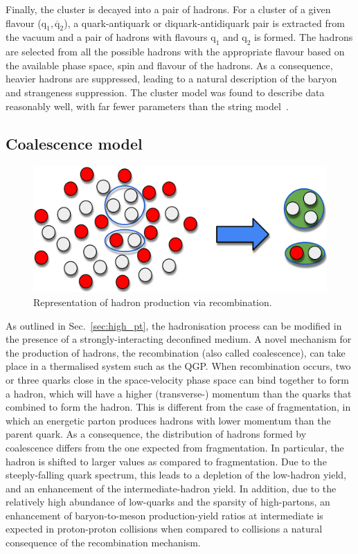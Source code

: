 Finally, the cluster is decayed into a pair of hadrons. For a cluster of a given flavour ($\mathrm{q_1, \overline{q}_2}$), a quark-antiquark or diquark-antidiquark pair is extracted from the vacuum and a pair of hadrons with flavours $\mathrm{q_1}$ and $\mathrm{q_2}$ is formed. The hadrons are selected from all the possible hadrons with the appropriate flavour based on the available phase space, spin and flavour of the hadrons. As a consequence, heavier hadrons are suppressed, leading to a natural description of the baryon and strangeness suppression. The cluster model was found to describe data reasonably well, with far fewer parameters than the string model~\cite{Seymour:2013ega}.

\subsection{Coalescence model}
\begin{figure}[htb]
    \centering
    \includegraphics[width=0.7\linewidth]{Figures/Chapter 2/Coalescence.png}
    \caption{Representation of hadron production via recombination.}
\end{figure}

As outlined in Sec.~\ref{sec:high_pt}, the hadronisation process can be modified in the presence of a strongly-interacting deconfined medium. A novel mechanism for the production of hadrons, the recombination (also called coalescence), can take place in a thermalised system such as the QGP. When recombination occurs, two or three quarks close in the space-velocity phase space can bind together to form a hadron, which will have a higher (transverse-) momentum than the quarks that combined to form the hadron. This is different from the case of fragmentation, in which an energetic parton produces hadrons with lower momentum than the parent quark. As a consequence, the \pt distribution of hadrons formed by coalescence differs from the one expected from fragmentation. In particular, the hadron \pt is shifted to larger values as compared to fragmentation. Due to the steeply-falling quark \pt spectrum, this leads to a depletion of the low-\pt hadron yield, and an enhancement of the intermediate-\pt hadron yield. In addition, due to the relatively high abundance of low-\pt quarks and the sparsity of high-\pt partons, an enhancement of baryon-to-meson production-yield ratios at intermediate \pt is expected in proton-proton collisions when compared to \ee collisions a natural consequence of the recombination mechanism. 

